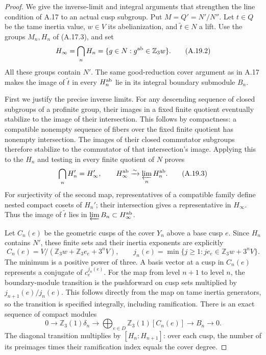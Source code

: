 \begin{proof}
We give the inverse-limit and integral arguments that
strengthen the line condition of A.17 to an actual cusp
subgroup. Put $M=Q'=N'/N''$. Let $t\in Q$ be the tame
inertia value, $w\in V$ its abelianization, and
$\widetilde t\in N$ a lift. Use the groups $M_n,H_n$
of (A.17.3), and set
\[
 H_\infty=\bigcap_nH_n
    =\{g\in N:g^{\rm ab}\in\mathbb Z_3w\}.
 \tag{A.19.2}
\]
All these groups contain $N'$. The same good-reduction
cover argument as in A.17 makes the image of
$\widetilde t$ in every $H_n^{\rm ab}$ lie in its integral
boundary submodule $B_n$.

First we justify the precise inverse limits. For any
descending sequence of closed subgroups of a profinite
group, their images in a fixed finite quotient eventually
stabilize to the image of their intersection. This follows
by compactness: a compatible nonempty sequence of fibers
over the fixed finite quotient has nonempty intersection.
The images of their closed commutator subgroups therefore
stabilize to the commutator of that intersection's image.
Applying this to the $H_n$ and testing in every finite
quotient of $N$ proves
\[
 \bigcap_n H_n'=H_\infty',\qquad
 H_\infty^{\rm ab}\xrightarrow{\sim}
                    \varprojlim_n H_n^{\rm ab}.
 \tag{A.19.3}
\]
For surjectivity of the second map, representatives of a
compatible family define nested compact cosets of $H_n'$;
their intersection gives a representative in $H_\infty$.
Thus the image of $\widetilde t$ lies in
$\varprojlim B_n\subset H_\infty^{\rm ab}$.

Let $C_n(e)$ be the geometric cusps of the cover $Y_n$
above a base cusp $e$. Since $H_n$ contains $N'$, these
finite sets and their inertia exponents are explicitly
\[
 C_n(e)=V/(\mathbb Z_3w+\mathbb Z_3e_e+3^nV),
 \qquad
 j_n(e)=\min\{j\ge1:j e_e\in
                         \mathbb Z_3w+3^nV\}.
 \tag{A.19.4}
\]
The minimum is a positive power of three. A basis vector
at a cusp in $C_n(e)$ represents a conjugate of
$c_e^{j_n(e)}$. For the map from level $n+1$ to level $n$,
the boundary-module transition is the pushforward on cusp
sets multiplied by $j_{n+1}(e)/j_n(e)$. This follows
directly from the map on tame inertia generators, so the
transition is specified integrally, including ramification.
There is an exact sequence of compact modules
\[
 0\to\mathbb Z_3(1)\delta_n\to
    \bigoplus_{e\in D}\mathbb Z_3(1)[C_n(e)]
       \to B_n\to0.
 \tag{A.19.5}
\]
The diagonal transition multiplies by $[H_n:H_{n+1}]$:
over each cusp, the number of its preimages times their
ramification index equals the cover degree.


\end{proof}
